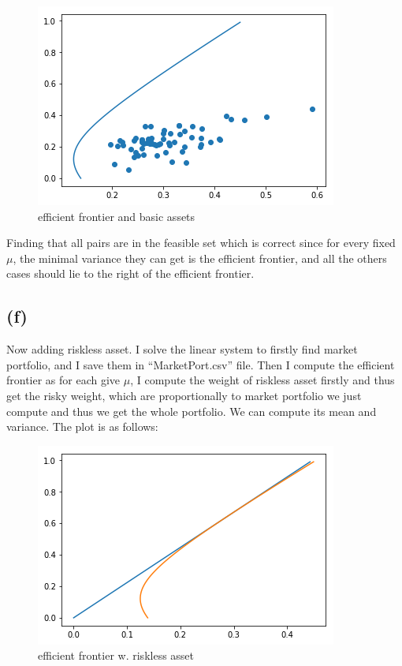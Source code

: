 \documentclass[letterpaper,11pt]{article}
\begin{document}
\begin{spacing}{1.2}
\begin{figure}[h] %
\centering
\includegraphics[scale=0.5]{1(e).png}
\caption{efficient frontier and basic assets}
\label{fig:label}
\end{figure}

Finding that all pairs are in the feasible set which is correct since for every fixed $\mu$, the minimal variance they can get is the efficient frontier, and all the others cases should lie to the right of the efficient frontier.

\subsection*{(f)}

Now adding riskless asset. I solve the linear system to firstly find market portfolio, and I save them in ``MarketPort.csv'' file. Then I compute the efficient frontier as for each give $\mu$, I compute the weight of riskless asset firstly and thus get the risky weight, which are proportionally to market portfolio we just compute and thus we get the whole portfolio. We can compute its mean and variance. The plot is as follows:

\begin{figure}[h] %
\centering
\includegraphics[scale=0.5]{1(f).png}
\caption{efficient frontier w. riskless asset}
\label{fig:label}
\end{figure}


\end{spacing}
\end{document}
